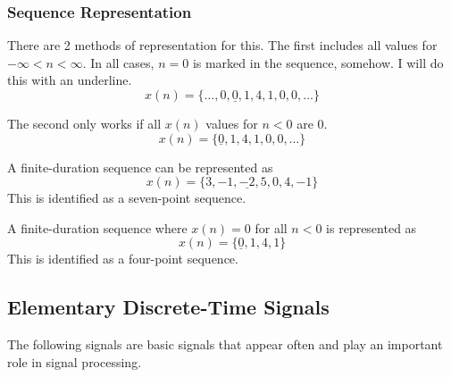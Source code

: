 \subsubsection{Sequence Representation}\label{subsubsec:Sequence Representation}
There are 2 methods of representation for this.
The first includes all values for $-\infty < n < \infty$.
In all cases, $n=0$ is marked in the sequence, somehow.
I will do this with an underline.
\begin{equation}\label{eq:Infinite Sequence Representation}
  x(n) = \lbrace \ldots, 0, \underline{0}, 1, 4, 1, 0, 0, \ldots \rbrace
\end{equation}

The second only works if all $x(n)$ values for $n < 0$ are 0.
\begin{equation}\label{eq:Zero Sequence Representation}
  x(n) = \lbrace \underline{0}, 1, 4, 1, 0, 0, \ldots \rbrace
\end{equation}

A finite-duration sequence can be represented as
\begin{equation}\label{eq:Finite Sequence Representation}
  x(n) = \lbrace 3, -1, \underline{-2}, 5, 0, 4, -1 \rbrace
\end{equation}
This is identified as a seven-point sequence.

A finite-duration sequence where $x(n)=0$ for all $n<0$ is represented as
\begin{equation}\label{eq:Zero Finite Sequence Representation}
  x(n) = \lbrace \underline{0}, 1, 4, 1 \rbrace
\end{equation}
This is identified as a four-point sequence.

\subsection{Elementary Discrete-Time Signals}\label{subsec:Elementary Discrete-Time Signals}
The following signals are basic signals that appear often and play an important role in signal processing.

